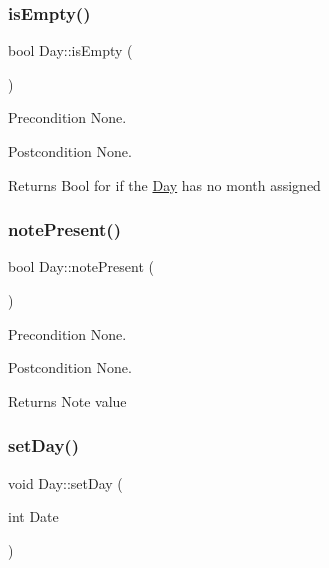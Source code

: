 \subsubsection{\texorpdfstring{is\+Empty()}{isEmpty()}}
{\footnotesize\ttfamily bool Day\+::is\+Empty (\begin{DoxyParamCaption}{ }\end{DoxyParamCaption})}

\begin{DoxyPrecond}{Precondition}
None. 
\end{DoxyPrecond}
\begin{DoxyPostcond}{Postcondition}
None. 
\end{DoxyPostcond}
\begin{DoxyReturn}{Returns}
Bool for if the \hyperlink{class_day}{Day} has no month assigned 
\end{DoxyReturn}
\hypertarget{class_day_a097b2409c34e772e1b133c2c344ab2bf}{}\label{class_day_a097b2409c34e772e1b133c2c344ab2bf} 
\subsubsection{\texorpdfstring{note\+Present()}{notePresent()}}
{\footnotesize\ttfamily bool Day\+::note\+Present (\begin{DoxyParamCaption}{ }\end{DoxyParamCaption})}

\begin{DoxyPrecond}{Precondition}
None. 
\end{DoxyPrecond}
\begin{DoxyPostcond}{Postcondition}
None. 
\end{DoxyPostcond}
\begin{DoxyReturn}{Returns}
Note value 
\end{DoxyReturn}
\hypertarget{class_day_a0dcbab77f0504f01fdd9a8584b590121}{}\label{class_day_a0dcbab77f0504f01fdd9a8584b590121} 
\subsubsection{\texorpdfstring{set\+Day()}{setDay()}}
{\footnotesize\ttfamily void Day\+::set\+Day (\begin{DoxyParamCaption}\item[{int}]{Date }\end{DoxyParamCaption})}

